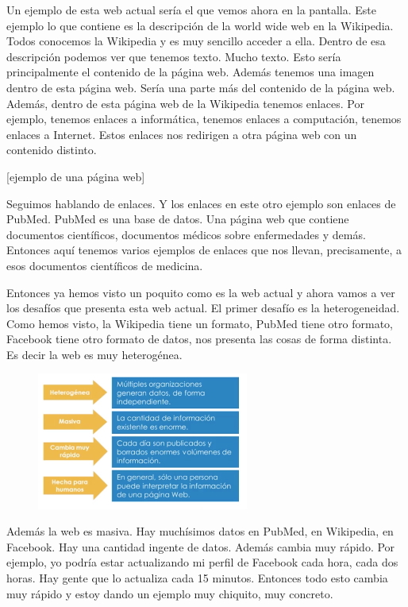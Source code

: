  Un ejemplo de esta web actual sería el que vemos ahora en la pantalla. Este ejemplo lo que contiene es la descripción de la world wide web en la Wikipedia. Todos conocemos la Wikipedia y es muy sencillo acceder a ella. Dentro de esa descripción podemos ver que tenemos texto. Mucho texto. Esto sería principalmente el contenido de la página web. Además tenemos una imagen dentro de esta página web. Sería una parte más del contenido de la página web. Además, dentro de esta página web de la Wikipedia tenemos enlaces. Por ejemplo, tenemos enlaces a informática, tenemos enlaces a computación, tenemos enlaces a Internet. Estos enlaces nos redirigen a otra página web con un contenido distinto.
 

 
 [ejemplo de una página web]
 
 
 Seguimos hablando de enlaces. Y los enlaces en este otro ejemplo son enlaces de PubMed. PubMed es una base de datos. Una página web que contiene documentos científicos, documentos médicos sobre enfermedades y demás. Entonces aquí tenemos varios ejemplos de enlaces que nos llevan, precisamente, a esos documentos científicos de medicina.
 
 
 Entonces ya hemos visto un poquito como es la web actual y ahora vamos a ver los desafíos que presenta esta web actual. El primer desafío es la heterogeneidad. Como hemos visto, la Wikipedia tiene un formato, PubMed tiene otro formato, Facebook tiene otro formato de datos, nos presenta las cosas de forma distinta. Es decir la web es muy heterogénea.
 
\begin{figure}[H]
	\centering
	\includegraphics[height=4.5cm]{imagenes/capitulo3/1}
	\caption{}
\end{figure}
 
 
 
 Además la web es masiva. Hay muchísimos datos en PubMed, en Wikipedia, en Facebook. Hay una cantidad ingente de datos. Además cambia muy rápido. Por ejemplo, yo podría estar actualizando mi perfil de Facebook cada hora, cada dos horas. Hay gente que lo actualiza cada 15 minutos. Entonces todo esto cambia muy rápido y estoy dando un ejemplo muy chiquito, muy concreto.
 
